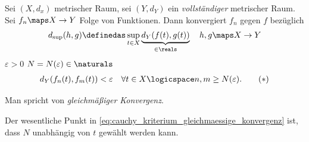\begin{lemma}\label{cauchy_kriterium_gleichmaessige_konvergenz}\hfill
    \begin{eigenschaftenenumerate}
        \item Sei \( (X,d_x)\) metrischer Raum, sei \( (Y,d_Y)\) ein \emph{vollständiger} metrischer Raum. Sei \( f_n\maps X\to Y\) Folge von Funktionen. Dann konvergiert \( f_n\) gegen \( f\) bezüglich
        \begin{align*}
            d_{\sup}(h,g)\definedas \sup_{t\in X} \underbrace {d_{Y}(f(t),g(t))}_{\in \reals } \quad h,g\maps X\to Y
        \end{align*}
        \tiff \tforall \( \varepsilon>0\) \texists \( N=N(\varepsilon)\in \naturals \) \sd
        \begin{align*}
            d_Y(f_n(t),f_m(t))<\varepsilon \quad \forall t\in X\logicspace n,m\geq N(\varepsilon).\tag{\(*\)}\label{eq:cauchy_kriterium_gleichmaessige_konvergenz}
        \end{align*} 
        \begin{notation*}
            Man spricht von \emph{gleichmäßiger Konvergenz}.
        \end{notation*}
         Der wesentliche Punkt in \eqref{eq:cauchy_kriterium_gleichmaessige_konvergenz} ist, dass \( N\) unabhängig von \( t\) gewählt werden kann.
        

\end{eigenschaftenenumerate}
\end{lemma}
